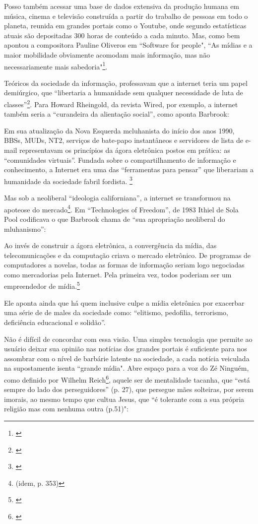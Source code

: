 Posso também acessar uma base de dados extensiva da produção humana em música, cinema e televisão construída a partir do trabalho de pessoas em todo o planeta, reunida em grandes portais como o Youtube, onde segundo estatísticas atuais são depositadas 300 horas de conteúdo a cada minuto. Mas, como bem apontou a compositora Pauline Oliveros em ``Software for people", ``As mídias e a maior mobilidade obviamente acomodam mais informação, mas não necessariamente mais sabedoria"\footnote{\cite[179]{Oliveros2012}}. 

Teóricos da sociedade da informação, professavam que a internet teria um papel demiúrgico, que ``libertaria a humanidade sem qualquer necessidade de luta de classes''\footnote{\cite[275]{Barbrook2009}}. Para Howard Rheingold, da revista Wired, por exemplo, a internet também seria a ``curandeira da alientação social'', como aponta Barbrook:


\begin{citacao}
Em sua atualização da Nova Esquerda mcluhanista do início dos anos 1990, BBSs, MUDs, NT2, serviços de bate-papo instantâneos e servidores de lista de e-mail representavam os princípios da ágora eletrônica postos em prática: as “comunidades virtuais”. Fundada sobre o compartilhamento de informação e conhecimento, a Internet era uma das “ferramentas para pensar” que liberariam a humanidade da sociedade fabril fordista. \footnote{\cite[350]{Barbrook2009}}
\end{citacao}

Mas sob a neoliberal ``ideologia californiana'', a internet se transformou na apoteose do mercado\footnote{(idem, p. 353)}. Em ``Technologies of Freedom'', de 1983 Ithiel de Sola Pool codificava o que Barbrook chama de ``sua apropriação neoliberal do mluhanismo'':
\begin{citacao}
Ao invés de construir a ágora eletrônica, a convergência da mídia, das telecomunicações e da computação criava o mercado eletrônico. De programas de computadores a novelas, todas as formas de informação seriam logo negociadas como mercadorias pela Internet. Pela primeira vez, todos poderiam ser um empreendedor de mídia.\footnote{\cite[348]{Barbrook2009}}
\end{citacao}

Ele aponta ainda que há quem inclusive culpe a mídia eletrônica por exacerbar uma série de de males da sociedade como: ``elitismo, pedofilia, terrorismo, deficiência educacional e solidão''. 

Não é difícil de concordar com essa visão. Uma simples tecnologia que permite ao usuário deixar sua opinião nas notícias dos grandes portais é suficiente para nos assombrar com o nível de barbárie latente na sociedade, a cada notícia veiculada na supostamente isenta ``grande mídia". Abre espaço para a voz do Zé Ninguém, como definido por Wilhelm Reich\footnote{\cite{reich1998escute}}, aquele ser de mentalidade tacanha, que ``está sempre do lado dos perseguidores'' (p. 27), que persegue mães solteiras, por serem imorais, ao mesmo tempo que cultua Jesus, que ``é tolerante com a sua própria religião mas com nenhuma outra (p.51)":

